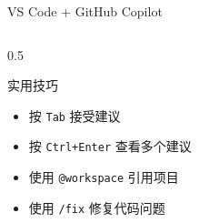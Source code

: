\documentclass[aspectratio=169,11pt]{beamer}
\begin{document}
\begin{frame}{VS Code + GitHub Copilot}
\begin{columns}
\begin{column}{0.5\textwidth}
            \vspace{0.3cm}
            \begin{exampleblock}{实用技巧}
                \begin{itemize}
                    \item 按 \texttt{Tab} 接受建议
                    \item 按 \texttt{Ctrl+Enter} 查看多个建议
                    \item 使用 \texttt{@workspace} 引用项目
                    \item 使用 \texttt{/fix} 修复代码问题
                \end{itemize}
            \end{exampleblock}
        \end{column}
    \end{columns}
\end{frame}
\end{document}
